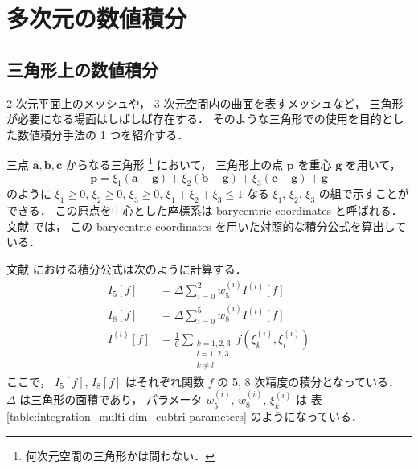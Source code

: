 %

\chapter{多次元の数値積分}

\section{三角形上の数値積分}

2 次元平面上のメッシュや，
3 次元空間内の曲面を表すメッシュなど，
三角形が必要になる場面はしばしば存在する．
そのような三角形での使用を目的とした数値積分手法の 1 つを紹介する．

三点 $\bm{a}, \bm{b}, \bm{c}$ からなる三角形
\footnote{何次元空間の三角形かは問わない．}
において，
三角形上の点 $\bm{p}$ を重心 $\bm{g}$ を用いて，
\begin{equation}
    \bm{p} = \xi_1 (\bm{a} - \bm{g}) + \xi_2 (\bm{b} - \bm{g}) + \xi_3 (\bm{c} - \bm{g}) + \bm{g}
\end{equation}
のように
$\xi_1 \ge 0$,
$\xi_2 \ge 0$,
$\xi_3 \ge 0$,
$\xi_1 + \xi_2 + \xi_3 \le 1$
なる $\xi_1$, $\xi_2$, $\xi_3$ の組で示すことができる．
この原点を中心とした座標系は barycentric coordinates と呼ばれる．
文献 \cite{Laurie1982} では，
この barycentric coordinates を用いた対照的な積分公式を算出している．

文献 \cite{Laurie1982} における積分公式は次のように計算する．
\begin{align}
    I_5[f]     & = \Delta \sum_{i=0}^2 w_5^{(i)} I^{(i)}[f] \\
    I_8[f]     & = \Delta \sum_{i=0}^5 w_8^{(i)} I^{(i)}[f] \\
    I^{(i)}[f] & = \frac{1}{6} \sum_{\substack{k = 1, 2, 3  \\ l = 1, 2, 3 \\ k \neq l}}
    f(\xi_k^{(i)}, \xi_l^{(i)})
\end{align}
ここで，
$I_5[f]$, $I_8[f]$ はそれぞれ関数 $f$ の 5, 8 次精度の積分となっている．
$\Delta$ は三角形の面積であり，
パラメータ $w_5^{(i)}$, $w_8^{(i)}$, $\xi_k^{(i)}$ は
表 \ref{table:integration_multi-dim_cubtri-parameters} のようになっている．

